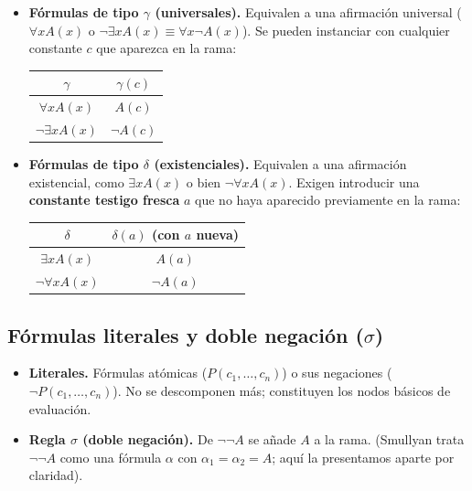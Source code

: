 \begin{itemize}
    \item \textbf{Fórmulas de tipo $\gamma$ (universales).}  
    Equivalen a una afirmación universal ($\forall x A(x)$ o $\neg \exists x A(x) \equiv \forall x \neg A(x)$). Se pueden instanciar con cualquier constante $c$ que aparezca en la rama:
    \begin{center}
    \begin{tabular}{|c|c|}
    \hline
    $\gamma$ & $\gamma(c)$ \\
    \hline
    $\forall x A(x)$ & $A(c)$ \\
    $\neg \exists x A(x)$ & $\neg A(c)$ \\
    \hline
    \end{tabular}
    \end{center}
    
    \item \textbf{Fórmulas de tipo $\delta$ (existenciales).} Equivalen a una afirmación existencial, como $\exists x A(x)$ o bien $\neg \forall x A(x)$. Exigen introducir una \textbf{constante testigo fresca} $a$ que no haya aparecido previamente en la rama:
    \begin{center}
    \begin{tabular}{|c|c|}
    \hline
    $\delta$ & $\delta(a)$ (con $a$ nueva) \\
    \hline
    $\exists x A(x)$ & $A(a)$ \\
    $\neg \forall x A(x)$ & $\neg A(a)$ \\
    \hline
    \end{tabular}
    \end{center}
\end{itemize}

\subsection{Fórmulas literales y doble negación (\texorpdfstring{$\sigma$}{sigma})}
\begin{itemize}
    \item \textbf{Literales.} Fórmulas atómicas ($P(c_1, \dots, c_n)$)
      o sus negaciones ($\neg P(c_1, \dots, c_n)$). No se
      descomponen más; constituyen los nodos básicos de evaluación.
    \item \textbf{Regla $\sigma$ (doble negación).} De $\neg\neg A$ se añade $A$ a la rama. (Smullyan trata $\neg\neg A$ como una fórmula $\alpha$ con $\alpha_1 = \alpha_2 = A$; aquí la presentamos aparte por claridad).
\end{itemize}

